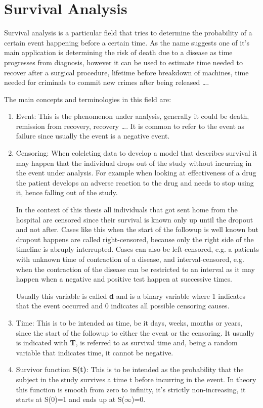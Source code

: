\section{Survival Analysis}
Survival analysis is a particular field that tries to determine the probability of a certain event happening before a certain time.
As the name suggests one of it's main application is determining the risk of death due to a disease as time progresses from diagnosis, however it can be used to estimate time needed to recover after a surgical procedure, lifetime before breakdown of machines, time needed for criminals to commit new crimes after being released \ldots. 

The main concepts and terminologies in this field are:

\begin{enumerate}
\item Event: This is the phenomenon under analysis, generally it could be death, remission from recovery, recovery \ldots .
It is common to refer to the event as failure since usually the event is a negative event.
\item Censoring: When colelcting data to develop a model that describes survival it may happen that the individual drops out of the study without incurring in the event under analysis.
For example when looking at effectiveness of a drug the patient develops an adverse reaction to the drug and needs to stop using it, hence falling out of the study.

In the context of this thesis all individuals that got sent home from the hospital are censored since their survival is known only up until the dropout and not after.
Cases like this when the start of the followup is well known but dropout happens are called right-censored, because only the right side of the timeline is abruply interrupted.
Cases can also be left-censored, e.g. a patients with unknown time of contraction of a disease, and interval-censored, e.g. when the contraction of the disease can be restricted to an interval as it may happen when a negative and positive test happen at successive times.

Usually this variable is called \textbf{d} and is a binary variable where 1 indicates that the event occurred and 0 indicates all possible censoring causes.
\item Time: This is to be intended as time, be it days, weeks, months or years, since the start of the followup to either the event or the censoring.
It usually is indicated with \textbf{T}, is referred to as survival time and, being a random variable that indicates time, it cannot be negative.
\item Survivor function \textbf{S(t)}: This is to be intended as the probability that the subject in the study survives a time t before incurring in the event.
In theory this function is smooth from zero to infinity, it's strictly non-increasing, it starts at S(0)=1 and ends up at S($\infty$)=0.


\end{enumerate}
